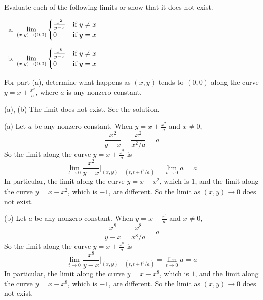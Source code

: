 \begin{question}
Evaluate each of the following limits or show that it does not exist.
\begin{enumerate}[(a)]
\item
$\displaystyle\lim_{(x,y)\rightarrow (0,0)}\begin{cases}
                                   \frac{x^2}{y-x} &\text{if $y\ne x$} \\
                                   0 & \text{if $y=x$}
                                   \end{cases}
$
\item
$\displaystyle\lim_{(x,y)\rightarrow(0,0)}\begin{cases}
                                   \frac{x^8}{y-x} &\text{if $y\ne x$} \\
                                   0 & \text{if $y=x$}
                                   \end{cases}
$
\end{enumerate}
\end{question}

\begin{hint}
For part (a), determine what happens as $(x,y)$ tends to $(0,0)$
along the curve $y=x+\frac{x^2}{a}$, where $a$ is any nonzero constant.

\end{hint}

\begin{answer}
(a), (b)  The limit does not exist. See the solution.
\end{answer}

\begin{solution}
(a) Let $a$ be any nonzero constant. When $y=x+\frac{x^2}{a}$ and $x\ne 0$,
\begin{equation*}
\frac{x^2}{y-x} =\frac{x^2}{x^2/a} =a
\end{equation*}
So the limit along the curve $y=x+\frac{x^2}{a}$ is
\begin{equation*}
\lim_{t\rightarrow 0}\frac{x^2}{y-x}\Big|_{(x,y)=(t,t+t^2/a)}
=\lim_{t\rightarrow 0}a
=a
\end{equation*}
In particular, the limit along the curve $y=x+x^2$, which is $1$, and 
the limit along the curve $y=x-x^2$, which is $-1$, are different.
So the limit as $(x,y)\rightarrow 0$ does not exist.

(b) Let $a$ be any nonzero constant. When $y=x+\frac{x^8}{a}$ and $x\ne 0$,
\begin{equation*}
\frac{x^8}{y-x} =\frac{x^8}{x^8/a} =a
\end{equation*}
So the limit along the curve $y=x+\frac{x^8}{a}$ is
\begin{equation*}
\lim_{t\rightarrow 0}\frac{x^8}{y-x}\Big|_{(x,y)=(t,t+t^8/a)}
=\lim_{t\rightarrow 0}a
=a
\end{equation*}
In particular, the limit along the curve $y=x+x^8$, which is $1$, and 
the limit along the curve $y=x-x^8$, which is $-1$, are different.
So the limit as $(x,y)\rightarrow 0$ does not exist.
\end{solution}

